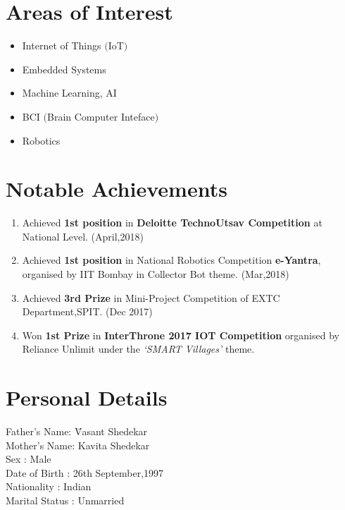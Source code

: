 \documentclass[margin]{res}
\begin{document}
\begin{resume}
\section{Areas of Interest}
\begin{itemize}
\item Internet of Things $($IoT$)$
\item Embedded Systems
\item Machine Learning, AI
\item BCI $($Brain Computer Inteface$)$
\item Robotics
\end{itemize}

\section{Notable Achievements}
\begin{enumerate}
\item Achieved \textbf{1st position} in \textbf{Deloitte TechnoUtsav Competition} at National Level. \hfill   (April,2018)
\item Achieved \textbf{1st position} in National Robotics Competition \textbf{e-Yantra}, organised by IIT Bombay in Collector Bot theme. \hfill   (Mar,2018)
\item Achieved \textbf{3rd Prize} in Mini-Project Competition of EXTC Department,SPIT. \hfill        (Dec 2017)
\item Won \textbf{1st Prize}  in \textbf{InterThrone 2017  IOT Competition} organised by Reliance Unlimit under the \textit{‘SMART Villages’} theme.    


\end{enumerate}

\section{Personal Details}
\begin{tabbing}
Father's Name: \hspace{1em} \= Vasant Shedekar \\
Mother's Name: \>  Kavita Shedekar \\
Sex : \> Male \\
Date of Birth : \>  26th September,1997 \\
Nationality :  \> Indian \\
Marital Status :  \> Unmarried \\
\end{tabbing}


\end{resume}
\end{document}
